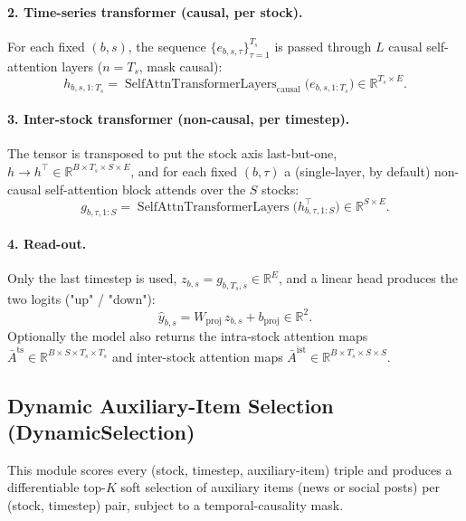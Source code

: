 \documentclass[stu,floatsintext]{apa7}
\newcommand{\R}{\mathbb{R}}
\begin{document}
\paragraph{2. Time-series transformer (causal, per stock).} For each fixed $(b,s)$, the sequence
$\{e_{b,s,\tau}\}_{\tau=1}^{T_s}$ is passed through $L$ causal self-attention layers
($n=T_s$, mask causal):
\begin{equation}
  h_{b,s,1:T_s} = \operatorname{SelfAttnTransformerLayers}_{\mathrm{causal}}\bigl(e_{b,s,1:T_s}\bigr)\in\R^{T_s\times E}.
\end{equation}

\paragraph{3. Inter-stock transformer (non-causal, per timestep).} The tensor is transposed to put the
stock axis last-but-one, $h \to h^\top \in \R^{B\times T_s\times S\times E}$, and for each fixed $(b,\tau)$
a (single-layer, by default) non-causal self-attention block attends over the $S$ stocks:
\begin{equation}
  g_{b,\tau,1:S} = \operatorname{SelfAttnTransformerLayers}\bigl(h^\top_{b,\tau,1:S}\bigr)\in\R^{S\times E}.
\end{equation}

\paragraph{4. Read-out.} Only the last timestep is used, $z_{b,s} = g_{b,T_s,s} \in\R^{E}$, and a linear
head produces the two logits ("up" / "down"):
\begin{equation}
  \hat y_{b,s} = W_{\mathrm{proj}}\, z_{b,s} + b_{\mathrm{proj}} \in\R^{2}.
\end{equation}
Optionally the model also returns the intra-stock attention maps $\bar A^{\mathrm{ts}}\in\R^{B\times S
\times T_s\times T_s}$ and inter-stock attention maps $\bar A^{\mathrm{ist}}\in\R^{B\times T_s\times S
\times S}$.

\subsection{Dynamic Auxiliary-Item Selection (DynamicSelection)}
\label{sec:dynsel}

This module scores every (stock, timestep, auxiliary-item) triple and produces a differentiable
top-$K$ soft selection of auxiliary items (news or social posts) per (stock, timestep) pair, subject to a
temporal-causality mask.
\end{document}
